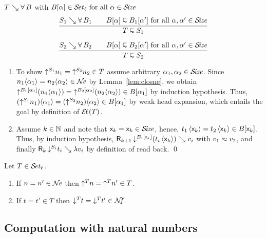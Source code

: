 \documentclass[acmsmall%
]{acmart}\settopmatter{printfolios=true}
\makeatletter
\newenvironment{proof*}[1][\proofname]{\par
  \normalfont \topsep6\p@\@plus6\p@\relax
  \trivlist
  \item[\@proofindent\hskip\labelsep
        {\@proofnamefont #1\@addpunct{.}}]\ignorespaces
}{%
  \endtrivlist\@endpefalse
}
\makeatother
\begin{document}
\begin{proof*}
\begin{caselist}
\nextcase $T \evalsto \forallT B$ with $B[\alpha] \in \SET[\ell] \mforall \alpha \in \SIZE$
\begin{gather*}
  \ru{S_1 \evalsto \forallT{B_1} \qquad
      B[\alpha] \shape B_1[\alpha'] \mforall \alpha, \alpha' \in \SIZE
    }{T \shape S_1}
\\[1.5ex]
  \ru{S_2 \evalsto \forallT{B_2} \qquad
      B[\alpha] \shape B_2[\alpha'] \mforall \alpha, \alpha' \in \SIZE
    }{T \shape S_2}
\end{gather*}
\begin{enumerate}
\item To show $\up{S_1}{n_1} = \up{S_2}{n_2} \in T$ assume arbitrary $\alpha_1,\alpha_2 \in \SIZE$.
  Since $n_1 \ann{\alpha_1} = n_2 \ann{\alpha_2} \in \NE$ by Lemma~\ref{lem:closne}, we obtain
  $\up{B_1[\alpha_1]}{(n_1 \ann{\alpha_1})} = \up{B_2[\alpha_2]}{(n_2 \ann{\alpha_2})} \in B[\alpha_1]$
  by induction hypothesis.
  Thus, $(\up{S_1}{n_1}) \ann{\alpha_1} = (\up{S_2}{n_2}) \ann{\alpha_2} \in B[\alpha_1]$
  by weak head expansion, which entails the goal by definition of $\EL(T)$.
\item Assume $k \in \NN$ and note that $\lev k = \lev k \in \SIZE$, hence,
  $t_1\,\ann{\lev k} = t_2\,\ann{\lev k} \in B[\lev k]$.  Thus, by induction hypothesis,
  $\R{k+1}{\down{B_i[\lev k]}(t_i\,\ann{\lev k})}{v_i}$ with $v_1 \nfeq v_2$, and finally
  $\R k {\down{S_i} t_i} {\lambda v_i}$ by definition of read back.
\qed
\end{enumerate}

\end{caselist}
\end{proof*}

\begin{corollary}
  \label{cor:rere}
  Let\/ $T \in \SET[\ell]$.
  \begin{enumerate}
  \item If\/ $n = n' \in \NE$ then $\up T n = \up T n' \in T$.
  \item If\/ $t = t' \in T$ then $\down T t = \down T {t'} \in \NF$.
  \end{enumerate}
\end{corollary}


\subsection{Computation with natural numbers}
\label{sec:comp}
\end{document}
